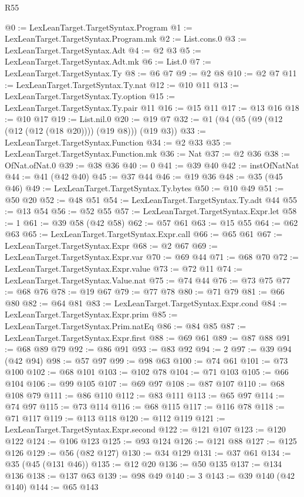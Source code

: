 \begin{lexlean}{R55}
\begin{coremodule}
{{{{{{{{{{{{{{{{{{{{{{{{{{{{{{{{{{{{{{{{{{{{{{{{{{{{{{{{{{{{@0 := LexLeanTarget.TargetSyntax.Program
@1 := LexLeanTarget.TargetSyntax.Program.mk
@2 := List.cons.{0}
@3 := LexLeanTarget.TargetSyntax.Adt
@4 := @2 @3
@5 := LexLeanTarget.TargetSyntax.Adt.mk
@6 := List.{0}
@7 := LexLeanTarget.TargetSyntax.Ty
@8 := @6 @7
@9 := @2 @8
@10 := @2 @7
@11 := LexLeanTarget.TargetSyntax.Ty.nat
@12 := @10 @11
@13 := LexLeanTarget.TargetSyntax.Ty.option
@15 := LexLeanTarget.TargetSyntax.Ty.pair @11
@16 := @15 @11
@17 := @13 @16
@18 := @10 @17
@19 := List.nil.{0}
@20 := @19 @7
@32 := @1 (@4 (@5 (@9 (@12 (@12 (@12 (@18 @20)))) (@19 @8))) (@19 @3))
@33 := LexLeanTarget.TargetSyntax.Function
@34 := @2 @33
@35 := LexLeanTarget.TargetSyntax.Function.mk
@36 := Nat
@37 := @2 @36
@38 := OfNat.ofNat.{0}
@39 := @38 @36
@40 := 0
@41 := @39 @40
@42 := instOfNatNat
@44 := @41 (@42 @40)
@45 := @37 @44
@46 := @19 @36
@48 := @35 (@45 @46)
@49 := LexLeanTarget.TargetSyntax.Ty.bytes
@50 := @10 @49
@51 := @50 @20
@52 := @48 @51
@54 := LexLeanTarget.TargetSyntax.Ty.adt @44
@55 := @13 @54
@56 := @52 @55
@57 := LexLeanTarget.TargetSyntax.Expr.let
@58 := 1
@61 := @39 @58 (@42 @58)
@62 := @57 @61
@63 := @15 @55
@64 := @62 @63
@65 := LexLeanTarget.TargetSyntax.Expr.call
@66 := @65 @61
@67 := LexLeanTarget.TargetSyntax.Expr
@68 := @2 @67
@69 := LexLeanTarget.TargetSyntax.Expr.var
@70 := @69 @44
@71 := @68 @70
@72 := LexLeanTarget.TargetSyntax.Expr.value
@73 := @72 @11
@74 := LexLeanTarget.TargetSyntax.Value.nat
@75 := @74 @44
@76 := @73 @75
@77 := @68 @76
@78 := @19 @67
@79 := @77 @78
@80 := @71 @79
@81 := @66 @80
@82 := @64 @81
@83 := LexLeanTarget.TargetSyntax.Expr.cond
@84 := LexLeanTarget.TargetSyntax.Expr.prim
@85 := LexLeanTarget.TargetSyntax.Prim.natEq
@86 := @84 @85
@87 := LexLeanTarget.TargetSyntax.Expr.first
@88 := @69 @61
@89 := @87 @88
@91 := @68 @89 @79
@92 := @86 @91
@93 := @83 @92
@94 := 2
@97 := @39 @94 (@42 @94)
@98 := @57 @97
@99 := @98 @63
@100 := @74 @61
@101 := @73 @100
@102 := @68 @101
@103 := @102 @78
@104 := @71 @103
@105 := @66 @104
@106 := @99 @105
@107 := @69 @97
@108 := @87 @107
@110 := @68 @108 @79
@111 := @86 @110
@112 := @83 @111
@113 := @65 @97
@114 := @74 @97
@115 := @73 @114
@116 := @68 @115
@117 := @116 @78
@118 := @71 @117
@119 := @113 @118
@120 := @112 @119
@121 := LexLeanTarget.TargetSyntax.Expr.second
@122 := @121 @107
@123 := @120 @122
@124 := @106 @123
@125 := @93 @124
@126 := @121 @88
@127 := @125 @126
@129 := @56 (@82 @127)
@130 := @34 @129
@131 := @37 @61
@134 := @35 (@45 (@131 @46))
@135 := @12 @20
@136 := @50 @135
@137 := @134 @136
@138 := @137 @63
@139 := @98 @49
@140 := 3
@143 := @39 @140 (@42 @140)
@144 := @65 @143
}}}}}}}}}}}}}}}}}}}}}}}}}}}}}}}}}}}}}}}}}}}}}}}}}}}}}}}}}}}}
\end{coremodule}
\end{lexlean}
